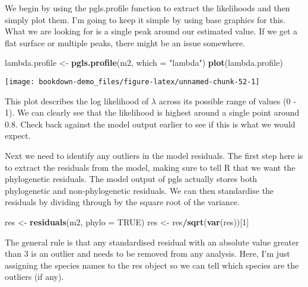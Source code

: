 \documentclass[]{book}
\newenvironment{Shaded}{\begin{snugshade}}{\end{snugshade}}
\newcommand{\KeywordTok}[1]{\textcolor[rgb]{0.13,0.29,0.53}{\textbf{#1}}}
\newcommand{\DataTypeTok}[1]{\textcolor[rgb]{0.13,0.29,0.53}{#1}}
\newcommand{\DecValTok}[1]{\textcolor[rgb]{0.00,0.00,0.81}{#1}}
\newcommand{\StringTok}[1]{\textcolor[rgb]{0.31,0.60,0.02}{#1}}
\newcommand{\OtherTok}[1]{\textcolor[rgb]{0.56,0.35,0.01}{#1}}
\newcommand{\OperatorTok}[1]{\textcolor[rgb]{0.81,0.36,0.00}{\textbf{#1}}}
\newcommand{\NormalTok}[1]{#1}
\begin{document}
We begin by using the pgls.profile function to extract the likelihoods
and then simply plot them. I'm going to keep it simple by using base
graphics for this. What we are looking for is a single peak around our
estimated value. If we get a flat surface or multiple peaks, there might
be an issue somewhere.

\begin{Shaded}
\begin{Highlighting}[]
\NormalTok{lambda.profile <-}\StringTok{ }\KeywordTok{pgls.profile}\NormalTok{(m2, }\DataTypeTok{which =} \StringTok{"lambda"}\NormalTok{)}
\KeywordTok{plot}\NormalTok{(lambda.profile)}
\end{Highlighting}
\end{Shaded}

\begin{center}\texttt{[image: bookdown-demo\_files/figure-latex/unnamed-chunk-52-1]} \end{center}

This plot describes the log likelihood of \(\lambda\) across its
possible range of values (0 - 1). We can clearly see that the likelihood
is highest around a single point around 0.8. Check back against the
model output earlier to see if this is what we would expect.

Next we need to identify any outliers in the model residuals. The first
step here is to extract the residuals from the model, making sure to
tell R that we want the phylogenetic residuals. The model output of pgls
actually stores both phylogenetic and non-phylogenetic residuals. We can
then standardise the residuals by dividing through by the square root of
the variance.

\begin{Shaded}
\begin{Highlighting}[]
\NormalTok{res <-}\StringTok{ }\KeywordTok{residuals}\NormalTok{(m2, }\DataTypeTok{phylo =} \OtherTok{TRUE}\NormalTok{)}
\NormalTok{res <-}\StringTok{ }\NormalTok{res}\OperatorTok{/}\KeywordTok{sqrt}\NormalTok{(}\KeywordTok{var}\NormalTok{(res))[}\DecValTok{1}\NormalTok{]}
\end{Highlighting}
\end{Shaded}

The general rule is that any standardised residual with an absolute
value greater than 3 is an outlier and needs to be removed from any
analysis. Here, I'm just assigning the species names to the res object
so we can tell which species are the outliers (if any).

\begin{Shaded}
\end{Shaded}
\end{document}
